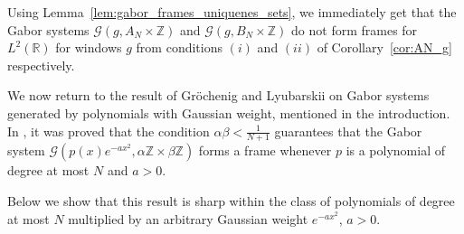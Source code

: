 \documentclass[10pt,a4paper]{amsart}
\numberwithin{equation}{section}
\newcommand{\R}{{\mathbb R}} \newcommand{\Q}{{\mathbb Q}} \newcommand{\Z}{{\mathbb Z}} \newcommand{\N}{{\mathbb N}}
\begin{document}
Using Lemma~\ref{lem:gabor_frames_uniquenes_sets}, we immediately get that the Gabor systems $\mathcal{G}(g, A_N\times\Z)$ and $\mathcal{G}(g, B_N\times\Z)$ do not form  frames for $L^2(\R)$ for windows $g$ from conditions $(i)$ and $(ii)$ of Corollary~\ref{cor:AN_g} respectively.

We now return to the result of Gr\"{o}chenig and Lyubarskii on Gabor systems generated by polynomials with Gaussian weight, mentioned in the introduction. In \cite{MR2529475}, it was proved that the condition
$
\alpha\beta<\frac{1}{N+1}
$
guarantees that the Gabor system
$
\mathcal{G}(p(x)e^{-a x^2},\alpha\Z\times\beta\Z)
$
forms a frame whenever $p$ is a polynomial of degree at most $N$ and $a>0$.

Below we show that this result is sharp within the class of polynomials of degree at most $N$ multiplied by an arbitrary Gaussian weight $e^{-a x^2}$, $a>0$.
\end{document}
